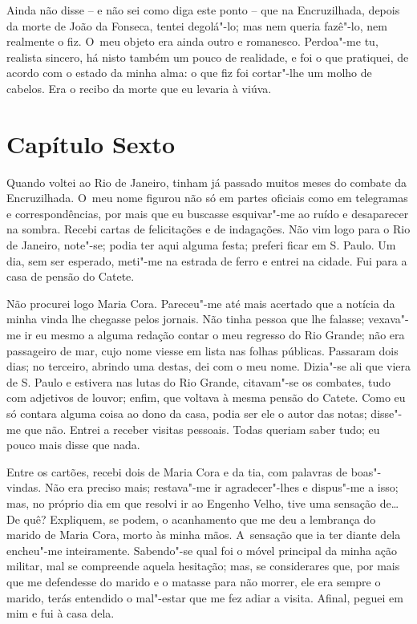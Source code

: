Ainda não disse -- e não sei como diga este ponto -- que na
Encruzilhada, depois da morte de João da Fonseca, tentei degolá"-lo; mas
nem queria fazê"-lo, nem realmente o fiz. O~meu objeto era ainda outro e
romanesco. Perdoa"-me tu, realista sincero, há nisto também um pouco de
realidade, e foi o que pratiquei, de acordo com o estado da minha alma:
o que fiz foi cortar"-lhe um molho de cabelos. Era o recibo da morte que
eu levaria à viúva.

\section{Capítulo Sexto}

Quando voltei ao Rio de Janeiro, tinham já passado muitos meses do
combate da Encruzilhada. O~meu nome figurou não só em partes oficiais
como em telegramas e correspondências, por mais que eu buscasse
esquivar"-me ao ruído e desaparecer na sombra. Recebi cartas de
felicitações e de indagações. Não vim logo para o Rio de Janeiro,
note"-se; podia ter aqui alguma festa; preferi ficar em S. Paulo. Um dia,
sem ser esperado, meti"-me na estrada de ferro e entrei na cidade. Fui
para a casa de pensão do Catete.

Não procurei logo Maria Cora. Pareceu"-me até mais acertado que a notícia
da minha vinda lhe chegasse pelos jornais. Não tinha pessoa que lhe
falasse; vexava"-me ir eu mesmo a alguma redação contar o meu regresso do
Rio Grande; não era passageiro de mar, cujo nome viesse em lista nas
folhas públicas. Passaram dois dias; no terceiro, abrindo uma destas,
dei com o meu nome. Dizia"-se ali que viera de S. Paulo e estivera nas
lutas do Rio Grande, citavam"-se os combates, tudo com adjetivos de
louvor; enfim, que voltava à mesma pensão do Catete. Como eu só contara
alguma coisa ao dono da casa, podia ser ele o autor das notas; disse"-me
que não. Entrei a receber visitas pessoais. Todas queriam saber tudo; eu
pouco mais disse que nada.

Entre os cartões, recebi dois de Maria Cora e da tia, com palavras de
boas"-vindas. Não era preciso mais; restava"-me ir agradecer"-lhes e
dispus"-me a isso; mas, no próprio dia em que resolvi ir ao Engenho
Velho, tive uma sensação de\ldots{} De quê? Expliquem, se podem, o
acanhamento que me deu a lembrança do marido de Maria Cora, morto às
minha mãos. A~sensação que ia ter diante dela encheu"-me inteiramente.
Sabendo"-se qual foi o móvel principal da minha ação militar, mal se
compreende aquela hesitação; mas, se considerares que, por mais que me
defendesse do marido e o matasse para não morrer, ele era sempre o
marido, terás entendido o mal"-estar que me fez adiar a visita. Afinal,
peguei em mim e fui à casa dela.

